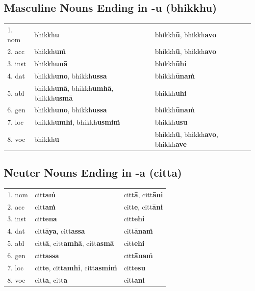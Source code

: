 \documentclass[11pt,oneside]{memoir}
\begin{document}
\subsection{Masculine Nouns Ending in -u (bhikkhu)}
\label{sec:orgee56951}

\begin{center}
\begin{tabular}{lll}
1. nom & bhikkh\textbf{u} & bhikkh\textbf{ū}, bhikkh\textbf{avo}\\[0pt]
2. acc & bhikkh\textbf{uṁ} & bhikkh\textbf{ū}, bhikkh\textbf{avo}\\[0pt]
3. inst & bhikkh\textbf{unā} & bhikkh\textbf{ūhi}\\[0pt]
4. dat & bhikkh\textbf{uno}, bhikkh\textbf{ussa} & bhikkh\textbf{ūnaṁ}\\[0pt]
5. abl & bhikkh\textbf{unā}, bhikkh\textbf{umhā}, bhikkh\textbf{usmā} & bhikkh\textbf{ūhi}\\[0pt]
6. gen & bhikkh\textbf{uno}, bhikkh\textbf{ussa} & bhikkh\textbf{ūnaṁ}\\[0pt]
7. loc & bhikkh\textbf{umhi}, bhikkh\textbf{usmiṁ} & bhikkh\textbf{ūsu}\\[0pt]
8. voc & bhikkh\textbf{u} & bhikkh\textbf{ū}, bhikkh\textbf{avo}, bhikkh\textbf{ave}\\[0pt]
\end{tabular}
\end{center}

\subsection{Neuter Nouns Ending in -a (citta)}
\label{sec:orga4df5b3}

\begin{center}
\begin{tabular}{lll}
1. nom & citt\textbf{aṁ} & citt\textbf{ā}, citt\textbf{āni}\\[0pt]
2. acc & citt\textbf{aṁ} & citt\textbf{e}, citt\textbf{āni}\\[0pt]
3. inst & citt\textbf{ena} & citt\textbf{ehi}\\[0pt]
4. dat & citt\textbf{āya}, citt\textbf{assa} & citt\textbf{ānaṁ}\\[0pt]
5. abl & citt\textbf{ā}, citt\textbf{amhā}, citt\textbf{asmā} & citt\textbf{ehi}\\[0pt]
6. gen & citt\textbf{assa} & citt\textbf{ānaṁ}\\[0pt]
7. loc & citt\textbf{e}, citt\textbf{amhi}, citt\textbf{asmiṁ} & citt\textbf{esu}\\[0pt]
8. voc & citt\textbf{a}, citt\textbf{ā} & citt\textbf{āni}\\[0pt]
\end{tabular}
\end{center}
\end{document}
